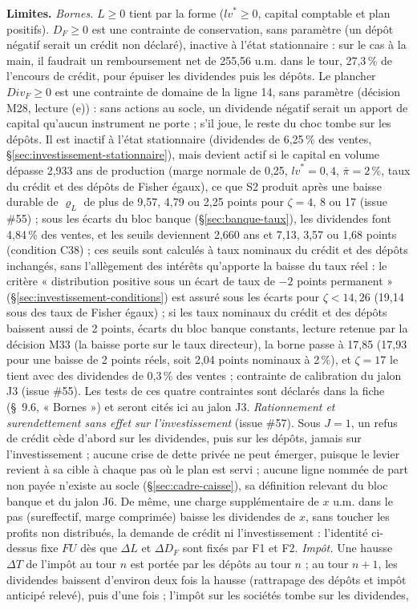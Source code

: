 \documentclass[11pt,a4paper]{article}
\newcommand{\og}{« }
\newcommand{\fg}{ »}
\newcommand{\limites}{\par\noindent\textbf{Limites.} }
\begin{document}
\begin{proposee}
\limites \emph{Bornes.} $L \ge 0$ tient par la forme ($\mathit{lv}^\ast \ge 0$, capital comptable et plan positifs). $D_F \ge 0$ est une contrainte de conservation, sans paramètre (un dépôt négatif serait un crédit non déclaré), inactive à l'état stationnaire : sur le cas à la main, il faudrait un remboursement net de 255,56 u.m. dans le tour, 27,3\,\% de l'encours de crédit, pour épuiser les dividendes puis les dépôts. Le plancher $\mathit{Div}_F \ge 0$ est une contrainte de domaine de la ligne 14, sans paramètre (décision M28, lecture (e)) : sans actions au socle, un dividende négatif serait un apport de capital qu'aucun instrument ne porte ; s'il joue, le reste du choc tombe sur les dépôts. Il est inactif à l'état stationnaire (dividendes de 6,25\,\% des ventes, \S\ref{sec:investissement-stationnaire}), mais devient actif si le capital en volume dépasse 2,933 ans de production (marge normale de 0,25, $\mathit{lv}^\ast = 0{,}4$, $\bar\pi = 2\,\%$, taux du crédit et des dépôts de Fisher égaux), ce que S2 produit après une baisse durable de $\varrho_L$ de plus de 9,57, 4,79 ou 2,25 points pour $\zeta = 4$, 8 ou 17 (issue \#55) ; sous les écarts du bloc banque (\S\ref{sec:banque-taux}), les dividendes font 4,84\,\% des ventes, et les seuils deviennent 2,660 ans et 7,13, 3,57 ou 1,68 points (condition C38) ; ces seuils sont calculés à taux nominaux du crédit et des dépôts inchangés, sans l'allègement des intérêts qu'apporte la baisse du taux réel : le critère \og distribution positive sous un écart de taux de $-2$ points permanent\fg{} (\S\ref{sec:investissement-conditions}) est assuré sous les écarts pour $\zeta < 14{,}26$ (19,14 sous des taux de Fisher égaux) ; si les taux nominaux du crédit et des dépôts baissent aussi de 2 points, écarts du bloc banque constants, lecture retenue par la décision M33 (la baisse porte sur le taux directeur), la borne passe à 17,85 (17,93 pour une baisse de 2 points réels, soit 2,04 points nominaux à 2\,\%), et $\zeta = 17$ le tient avec des dividendes de 0,3\,\% des ventes ; contrainte de calibration du jalon J3 (issue \#55). Les tests de ces quatre contraintes sont déclarés dans la fiche (\S~9.6, « Bornes ») et seront cités ici au jalon J3. \emph{Rationnement et surendettement sans effet sur l'investissement} (issue \#57). Sous $J = 1$, un refus de crédit cède d'abord sur les dividendes, puis sur les dépôts, jamais sur l'investissement ; aucune crise de dette privée ne peut émerger, puisque le levier revient à sa cible à chaque pas où le plan est servi ; aucune ligne nommée de part non payée n'existe au socle (\S\ref{sec:cadre-caisse}), sa définition relevant du bloc banque et du jalon J6. De même, une charge supplémentaire de $x$ u.m. dans le pas (sureffectif, marge comprimée) baisse les dividendes de $x$, sans toucher les profits non distribués, la demande de crédit ni l'investissement : l'identité ci-dessus fixe $\mathit{FU}$ dès que $\Delta L$ et $\Delta D_F$ sont fixés par F1 et F2. \emph{Impôt.} Une hausse $\Delta T$ de l'impôt au tour $n$ est portée par les dépôts au tour $n$ ; au tour $n + 1$, les dividendes baissent d'environ deux fois la hausse (rattrapage des dépôts et impôt anticipé relevé), puis d'une fois ; l'impôt sur les sociétés tombe sur les dividendes, 
\end{proposee}
\end{document}
